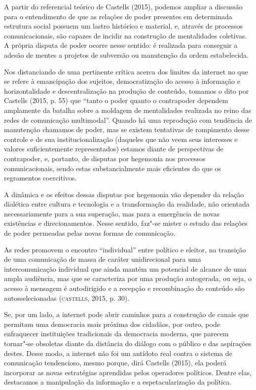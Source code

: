 A partir do referencial teórico de Castells (2015), podemos ampliar a
discussão para o entendimento de que as relações de poder presentes em
determinada estrutura social possuem um lastro histórico e material, e,
através de processos comunicacionais, são capazes de incidir na
construção de mentalidades coletivas. A própria disputa de poder ocorre
nesse sentido: é realizada para conseguir a adesão de mentes a projetos
de subversão ou manutenção da ordem estabelecida.

Nos distanciando de uma pertinente crítica acerca dos limites da
internet no que se refere à emancipação dos sujeitos, democratização do
acesso à informação e horizontalidade e descentralização na produção de
conteúdo, tomamos o dito por Castells (2015, p. 55) que ``tanto o poder
quanto o contrapoder dependem amplamente da batalha sobre a moldagem de
mentalidades realizada no reino das redes de comunicação multimodal''.
Quando há uma reprodução com tendência de manutenção chamamos de poder,
mas se existem tentativas de rompimento desse controle e de sua
institucionalização (daqueles que não veem seus interesses e valores
suficientemente representados) estamos diante de perspectivas de
contrapoder, e, portanto, de disputas por hegemonia nos processos
comunicacionais, sendo estas substancialmente mais eficientes do que os
regramentos coercitivos.

A dinâmica e os efeitos dessas disputas por hegemonia vão depender da
relação dialética entre cultura e tecnologia e a transformação da
realidade, não orientada necessariamente para a sua superação, mas para
a emergência de novas existências e direcionamentos. Nesse sentido,
faz"-se mister o estudo das relações de poder permeadas pelas novas
formas de comunicação.

As redes promovem o encontro ``individual'' entre político e eleitor, na
transição de uma comunicação de massa de caráter unidirecional para uma
intercomunicação individual que ainda mantém um potencial de alcance de
uma ampla audiência, mas que se caracteriza por uma produção autogerada,
ou seja, o acesso à mensagem é autodirigido e a recepção e recombinação
do conteúdo são autosselecionadas (\textsc{castells}, 2015, p. 30).

Se, por um lado, a internet pode abrir caminhos para a construção de
canais que permitam uma democracia mais próxima dos cidadãos, por outro,
pode enfraquecer instituições tradicionais da democracia moderna, que
parecem tornar"-se obsoletas diante da distância do diálogo com o público
e das aspirações destes. Desse modo, a internet não foi um antídoto real
contra o sistema de comunicação tendencioso, mesmo porque, dirá Castells
(2015), ela poderá incorporar as novas estratégias aprendidas pelos
operadores políticos. Dentre elas, destacamos a manipulação da
informação e a espetacularização da política.

